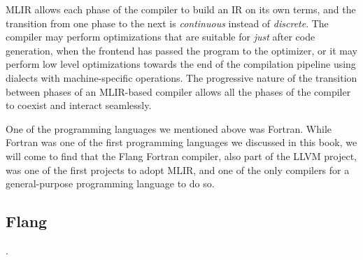 MLIR allows each phase of the compiler to build an IR on its own terms,
and the transition from one phase to the next is \textit{continuous}
instead of \textit{discrete}.
The compiler may perform optimizations that are suitable for \textit{just} after
code generation, when the frontend has passed the program to the optimizer,
or it may perform low level optimizations towards the end of the compilation
pipeline using dialects with machine-specific operations.
The progressive nature of the transition between phases of an MLIR-based compiler
allows all the phases of the compiler to coexist and interact seamlessly.

One of the programming languages we mentioned above was Fortran.
While Fortran was one of the first programming languages we discussed in this book,
we will come to find that the Flang Fortran compiler, also part of the LLVM project,
was one of the first projects to adopt MLIR, and one of the only compilers for a
general-purpose programming language to do so.

\subsection{Flang}

.
